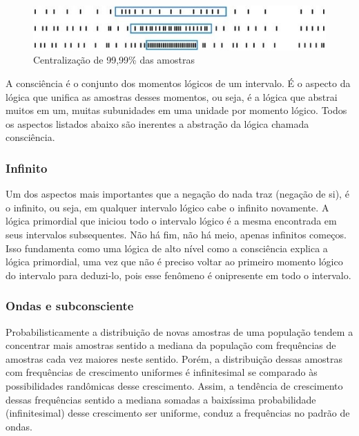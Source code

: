 \begin{figure}[H]
\caption{Centralização de 99,99\% das amostras}
\label{fig:centering_of_99_range}
\centering
\includegraphics[scale=1]{sections/images/centering_of_99_range.jpg}
\end{figure}

A consciência é o conjunto dos momentos lógicos de um intervalo. É o aspecto da lógica que unifica as amostras desses momentos, ou seja, é a lógica que abstrai muitos em um, muitas subunidades em uma unidade por momento lógico. Todos os aspectos listados abaixo são inerentes a abstração da lógica chamada consciência.

\subsubsection{Infinito}
Um dos aspectos mais importantes que a negação do nada traz (negação de si), é o infinito, ou seja, em qualquer intervalo lógico cabe o infinito novamente. A lógica primordial que iniciou todo o intervalo lógico é a mesma encontrada em seus intervalos subsequentes. Não há fim, não há meio, apenas infinitos começos. Isso fundamenta como uma lógica de alto nível como a consciência explica a lógica primordial, uma vez que não é preciso voltar ao primeiro momento lógico do intervalo para deduzi-lo, pois esse fenômeno é onipresente em todo o intervalo.

\subsubsection{Ondas e subconsciente}
Probabilisticamente a distribuição de novas amostras de uma população tendem a concentrar mais amostras sentido a mediana da população com frequências de amostras cada vez maiores neste sentido. Porém, a distribuição dessas amostras com frequências de crescimento uniformes é infinitesimal se comparado às possibilidades randômicas desse crescimento. Assim, a tendência de crescimento dessas frequências sentido a mediana somadas a baixíssima probabilidade (infinitesimal) desse crescimento ser uniforme, conduz a frequências no padrão de ondas.

